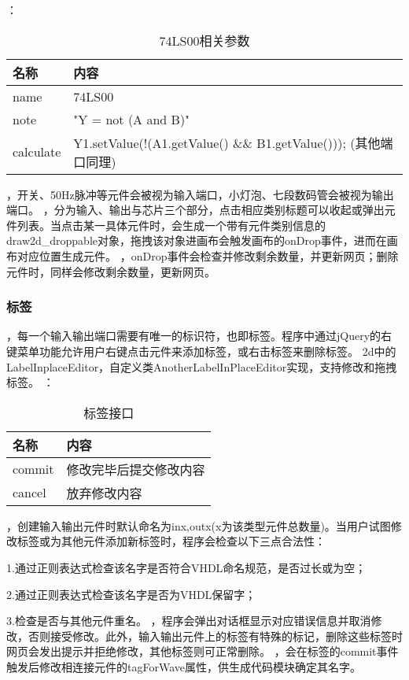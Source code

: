 \documentclass{article}
\begin{document}
\begin{CJK}{UTF8}{gbsn}
    ：
    \begin{table}[!h]
    \begin{tabular}{|l|l|}
    \hline
    名称 & 内容 \\
    \hline
    name & 74LS00 \\
    \hline
    note & "Y = not (A and B)" \\
    \hline
    calculate & Y1.setValue(!(A1.getValue() \&\& B1.getValue())); (其他端口同理) \\
    \hline
    \end{tabular}
    \caption{74LS00相关参数}
    \end{table}

    ，开关、50Hz脉冲等元件会被视为输入端口，小灯泡、七段数码管会被视为输出端口。
    ，分为输入、输出与芯片三个部分，点击相应类别标题可以收起或弹出元件列表。当点击某一具体元件时，会生成一个带有元件类别信息的draw2d\_droppable对象，拖拽该对象进画布会触发画布的onDrop事件，进而在画布对应位置生成元件。
    ，onDrop事件会检查并修改剩余数量，并更新网页；删除元件时，同样会修改剩余数量，更新网页。

\subsubsection{标签}
    ，每一个输入输出端口需要有唯一的标识符，也即标签。程序中通过jQuery的右键菜单功能允许用户右键点击元件来添加标签，或右击标签来删除标签。
    2d中的LabelInplaceEditor，自定义类AnotherLabelInPlaceEditor实现，支持修改和拖拽标签。
    ：
    \begin{table}[!h]
    \begin{tabular}{|l|l|}
    \hline
    名称 & 内容 \\
    \hline
    commit & 修改完毕后提交修改内容 \\
    \hline
    cancel & 放弃修改内容 \\
    \hline
    \end{tabular}
    \caption{标签接口}
    \end{table}
    ，创建输入输出元件时默认命名为inx,outx(x为该类型元件总数量)。当用户试图修改标签或为其他元件添加新标签时，程序会检查以下三点合法性：
    \par1.通过正则表达式检查该名字是否符合VHDL命名规范，是否过长或为空；
    \par2.通过正则表达式检查该名字是否为VHDL保留字；
    \par3.检查是否与其他元件重名。
    ，程序会弹出对话框显示对应错误信息并取消修改，否则接受修改。此外，输入输出元件上的标签有特殊的标记，删除这些标签时网页会发出提示并拒绝修改，其他标签则可正常删除。
    ，会在标签的commit事件触发后修改相连接元件的tagForWave属性，供生成代码模块确定其名字。
    

\end{CJK}
\end{document}
